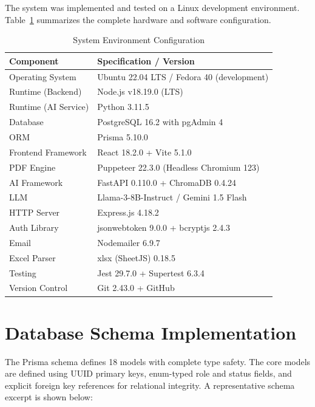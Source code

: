 \documentclass[12pt]{report}
\begin{document}
The system was implemented and tested on a Linux development environment. Table~\ref{tab:env_config} summarizes the complete hardware and software configuration.

\begin{table}[H]
\centering
\caption{System Environment Configuration}\label{tab:env_config}
\begin{tabular}{l l}
\toprule
\textbf{Component} & \textbf{Specification / Version}\\
\midrule
Operating System & Ubuntu 22.04 LTS / Fedora 40 (development)\\
Runtime (Backend) & Node.js v18.19.0 (LTS)\\
Runtime (AI Service) & Python 3.11.5\\
Database & PostgreSQL 16.2 with pgAdmin 4\\
ORM & Prisma 5.10.0\\
Frontend Framework & React 18.2.0 + Vite 5.1.0\\
PDF Engine & Puppeteer 22.3.0 (Headless Chromium 123)\\
AI Framework & FastAPI 0.110.0 + ChromaDB 0.4.24\\
LLM & Llama-3-8B-Instruct / Gemini 1.5 Flash\\
HTTP Server & Express.js 4.18.2\\
Auth Library & jsonwebtoken 9.0.0 + bcryptjs 2.4.3\\
Email & Nodemailer 6.9.7\\
Excel Parser & xlsx (SheetJS) 0.18.5\\
Testing & Jest 29.7.0 + Supertest 6.3.4\\
Version Control & Git 2.43.0 + GitHub\\
\bottomrule
\end{tabular}
\end{table}

\section{Database Schema Implementation}

The Prisma schema defines 18 models with complete type safety. The core models are defined using UUID primary keys, enum-typed role and status fields, and explicit foreign key references for relational integrity. A representative schema excerpt is shown below:
\end{document}
